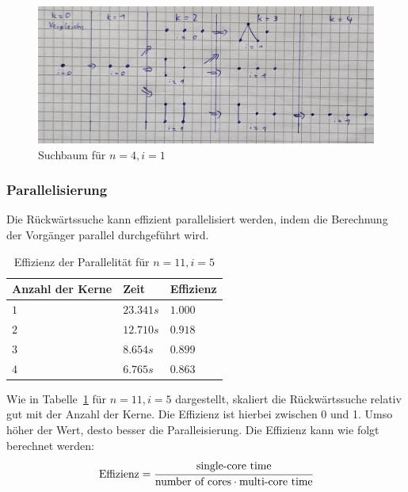 \documentclass[10pt,journal,compsoc]{IEEEtran}
\begin{document}
\begin{figure}[h!]
  \centering
  \includegraphics[width=\columnwidth]{figures/backward-search-tree.jpg}
  \caption{Suchbaum für $n = 4, i = 1$}
  \label{fig:backward-search-tree}
\end{figure}



\subsubsection{Parallelisierung} \label{sec:backward:parallelisation}
Die Rückwärtssuche kann effizient parallelisiert werden, indem die Berechnung der Vorgänger parallel durchgeführt wird.

\begin{table}
  \begin{tabular}{l|l|l}
    Anzahl der Kerne & Zeit      & Effizienz \\
    \hline
    $1$              & $23.341s$ & $1.000$   \\
    $2$              & $12.710s$ & $0.918$   \\
    $3$              & $8.654s$  & $0.899$   \\
    $4$              & $6.765s$  & $0.863$   \\
  \end{tabular}
  \centering
  \caption{Effizienz der Parallelität für $n = 11, i = 5$}
  \label{table:backward-parallel}
\end{table}

Wie in Tabelle~\ref{table:backward-parallel} für $n = 11, i = 5$ dargestellt, skaliert die Rückwärtssuche relativ gut mit der Anzahl der Kerne.
Die Effizienz ist hierbei zwischen 0 und 1.
Umso höher der Wert, desto besser die Paralleisierung.
Die Effizienz kann wie folgt berechnet werden:
\[
  \text{Effizienz} = \cfrac{\text{single-core time}}{\text{number of cores} \cdot \text{multi-core time}}
\]
\end{document}
